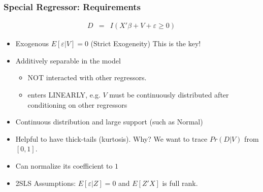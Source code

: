 \begin{frame}
\frametitle{Special Regressor: Requirements}
\begin{eqnarray*}
D &=& I ( X' \beta + V + \varepsilon \geq 0 )
\end{eqnarray*}
\vspace{-8pt}
\begin{itemize}
\item Exogenous $E[\varepsilon | V ] =0$ (Strict Exogeneity) \alert{This is the key!} 
\item Additively separable in the model
\begin{itemize}
       \item NOT interacted with other regressors.
       \item enters LINEARLY, e.g. $V$ must be continuously distributed after conditioning on other regressors 
\end{itemize}
\item Continuous distribution and large support (such as Normal)

\item Helpful to have thick-tails (kurtosis). Why? We want to trace $Pr(D | V)$ from $[0,1]$.
\item Can normalize its coefficient to $1$
\item 2SLS Assumptions: $E[ \varepsilon | Z] = 0$ and $E[Z'X]$ is full rank.
\end{itemize}
\end{frame}


